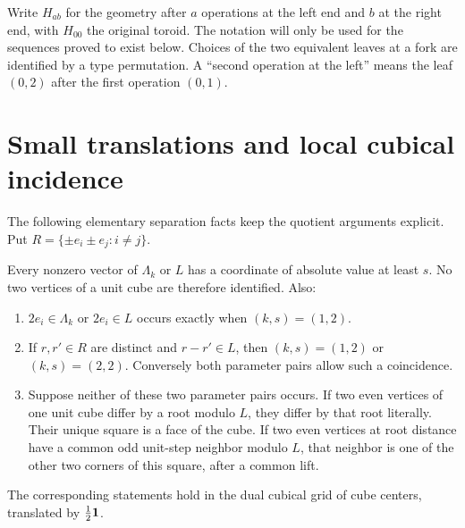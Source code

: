 Write $H_{ab}$ for the geometry after $a$ operations at the left end
and $b$ at the right end, with $H_{00}$ the original toroid. The notation
will only be used for the sequences proved to exist below. Choices of
the two equivalent leaves at a fork are identified by a type
permutation. A ``second operation at the left'' means the leaf
$(0,2)$ after the first operation $(0,1)$.

\section{Small translations and local cubical incidence}
The following elementary separation facts keep the quotient arguments
explicit. Put $R=\{\pm e_i\pm e_j:i\ne j\}$.

\begin{lemma}\label{NI.separation}
Every nonzero vector of $\Lambda_k$ or $L$ has a coordinate of absolute
value at least $s$. No two vertices of a unit cube are therefore
identified. Also:
\begin{enumerate}
\item $2e_i\in\Lambda_k$ or $2e_i\in L$ occurs exactly when
$(k,s)=(1,2)$.
\item If $r,r'\in R$ are distinct and $r-r'\in L$, then
$(k,s)=(1,2)$ or $(k,s)=(2,2)$. Conversely both parameter pairs
allow such a coincidence.
\item Suppose neither of these two parameter pairs occurs. If two
even vertices of one unit cube differ by a root modulo $L$, they
differ by that root literally. Their unique square is a face of
the cube. If two even vertices at root distance have a common odd
unit-step neighbor modulo $L$, that neighbor is one of the other
two corners of this square, after a common lift.
\end{enumerate}
The corresponding statements hold in the dual cubical grid of
cube centers, translated by $\frac12\mathbf1$.
\end{lemma}
